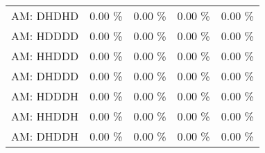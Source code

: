 \begin{tabular}{|l|r|r|r|r|}
AM: DHDHD                    &    0.00 \%  &    0.00 \%  &    0.00 \%  &    0.00 \% \\
AM: HDDDD                    &    0.00 \%  &    0.00 \%  &    0.00 \%  &    0.00 \% \\
AM: HHDDD                    &    0.00 \%  &    0.00 \%  &    0.00 \%  &    0.00 \% \\
AM: DHDDD                    &    0.00 \%  &    0.00 \%  &    0.00 \%  &    0.00 \% \\
AM: HDDDH                    &    0.00 \%  &    0.00 \%  &    0.00 \%  &    0.00 \% \\
AM: HHDDH                    &    0.00 \%  &    0.00 \%  &    0.00 \%  &    0.00 \% \\
AM: DHDDH                    &    0.00 \%  &    0.00 \%  &    0.00 \%  &    0.00 \% \\
\hline
\end{tabular}
